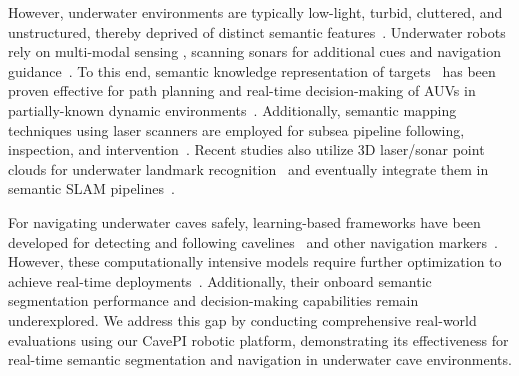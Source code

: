 However, underwater environments are typically low-light, turbid, cluttered, and unstructured, thereby deprived of distinct semantic features~\cite{islam2024computer}. Underwater robots rely on multi-modal sensing \eg, scanning sonars for additional cues and navigation guidance~\cite{caccia2001sonar,teixeira2019dense,yu2019segmentation}. To this end, semantic knowledge representation of targets~\cite{patron2008semantic} has been proven effective for path planning and real-time decision-making of AUVs in partially-known dynamic environments~\cite{patron2010semantic}. Additionally, semantic mapping techniques using laser scanners are employed for subsea pipeline following, inspection, and intervention~\cite{vallicrosa2021semantic}. Recent studies also utilize 3D laser/sonar point clouds for underwater landmark recognition~\cite{himri2018semantic} and eventually integrate them in semantic SLAM pipelines~\cite{song2024experimental}. 


For navigating underwater caves safely, learning-based frameworks have been developed for detecting and following cavelines~\cite{yu2023weakly} and other navigation markers~\cite{abdullah2023caveseg}. However, these computationally intensive models require further optimization to achieve real-time deployments~\cite{mohammadi2024edge}. Additionally, their onboard semantic segmentation performance and decision-making capabilities remain underexplored. We address this gap by conducting comprehensive real-world evaluations using our CavePI robotic platform, demonstrating its effectiveness for real-time semantic segmentation and navigation in underwater cave environments.




